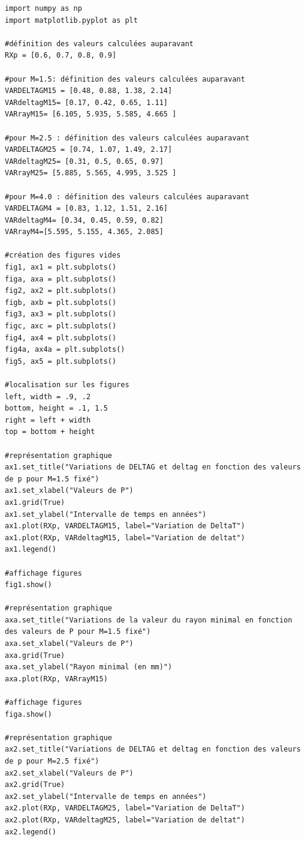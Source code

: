 \documentclass[12pt,a4paper]{article}
\begin{document}
\begin{lstlisting}[style=stylepython]
import numpy as np
import matplotlib.pyplot as plt

#définition des valeurs calculées auparavant 
RXp = [0.6, 0.7, 0.8, 0.9]

#pour M=1.5: définition des valeurs calculées auparavant 
VARDELTAGM15 = [0.48, 0.88, 1.38, 2.14]
VARdeltagM15= [0.17, 0.42, 0.65, 1.11]
VARrayM15= [6.105, 5.935, 5.585, 4.665 ]

#pour M=2.5 : définition des valeurs calculées auparavant 
VARDELTAGM25 = [0.74, 1.07, 1.49, 2.17]
VARdeltagM25= [0.31, 0.5, 0.65, 0.97]
VARrayM25= [5.885, 5.565, 4.995, 3.525 ]

#pour M=4.0 : définition des valeurs calculées auparavant 
VARDELTAGM4 = [0.83, 1.12, 1.51, 2.16]
VARdeltagM4= [0.34, 0.45, 0.59, 0.82]
VARrayM4=[5.595, 5.155, 4.365, 2.085]

#création des figures vides 
fig1, ax1 = plt.subplots()
figa, axa = plt.subplots()
fig2, ax2 = plt.subplots()
figb, axb = plt.subplots()
fig3, ax3 = plt.subplots()
figc, axc = plt.subplots()
fig4, ax4 = plt.subplots()
fig4a, ax4a = plt.subplots()
fig5, ax5 = plt.subplots()

#localisation sur les figures 
left, width = .9, .2
bottom, height = .1, 1.5
right = left + width
top = bottom + height

#représentation graphique 
ax1.set_title("Variations de DELTAG et deltag en fonction des valeurs de p pour M=1.5 fixé")
ax1.set_xlabel("Valeurs de P")
ax1.grid(True)
ax1.set_ylabel("Intervalle de temps en années")
ax1.plot(RXp, VARDELTAGM15, label="Variation de DeltaT")
ax1.plot(RXp, VARdeltagM15, label="Variation de deltat")
ax1.legend()

#affichage figures 
fig1.show()

#représentation graphique 
axa.set_title("Variations de la valeur du rayon minimal en fonction des valeurs de P pour M=1.5 fixé")
axa.set_xlabel("Valeurs de P")
axa.grid(True)
axa.set_ylabel("Rayon minimal (en mm)")
axa.plot(RXp, VARrayM15)

#affichage figures 
figa.show()

#représentation graphique 
ax2.set_title("Variations de DELTAG et deltag en fonction des valeurs de p pour M=2.5 fixé")
ax2.set_xlabel("Valeurs de P")
ax2.grid(True)
ax2.set_ylabel("Intervalle de temps en années")
ax2.plot(RXp, VARDELTAGM25, label="Variation de DeltaT")
ax2.plot(RXp, VARdeltagM25, label="Variation de deltat")
ax2.legend()


\end{lstlisting}
\end{document}

